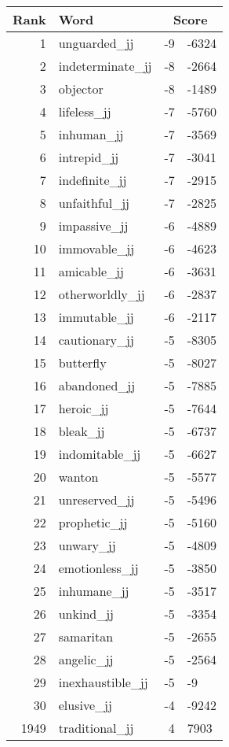 \begin{longtable}[!htbp]{| rlr@{.}l |}
    \hline
    \textbf{Rank} & \textbf{Word} & \multicolumn{2}{c|}{\textbf{Score}} \\
    \hline
    \endhead
    1 & unguarded\_jj & -9 & -6324 \\
    2 & indeterminate\_jj & -8 & -2664 \\
    3 & objector & -8 & -1489 \\
    4 & lifeless\_jj & -7 & -5760 \\
    5 & inhuman\_jj & -7 & -3569 \\
    6 & intrepid\_jj & -7 & -3041 \\
    7 & indefinite\_jj & -7 & -2915 \\
    8 & unfaithful\_jj & -7 & -2825 \\
    9 & impassive\_jj & -6 & -4889 \\
    10 & immovable\_jj & -6 & -4623 \\
    11 & amicable\_jj & -6 & -3631 \\
    12 & otherworldly\_jj & -6 & -2837 \\
    13 & immutable\_jj & -6 & -2117 \\
    14 & cautionary\_jj & -5 & -8305 \\
    15 & butterfly & -5 & -8027 \\
    16 & abandoned\_jj & -5 & -7885 \\
    17 & heroic\_jj & -5 & -7644 \\
    18 & bleak\_jj & -5 & -6737 \\
    19 & indomitable\_jj & -5 & -6627 \\
    20 & wanton & -5 & -5577 \\
    21 & unreserved\_jj & -5 & -5496 \\
    22 & prophetic\_jj & -5 & -5160 \\
    23 & unwary\_jj & -5 & -4809 \\
    24 & emotionless\_jj & -5 & -3850 \\
    25 & inhumane\_jj & -5 & -3517 \\
    26 & unkind\_jj & -5 & -3354 \\
    27 & samaritan & -5 & -2655 \\
    28 & angelic\_jj & -5 & -2564 \\
    29 & inexhaustible\_jj & -5 & -9 \\
    30 & elusive\_jj & -4 & -9242 \\
    1949 & traditional\_jj & 4 & 7903 \\

\end{longtable}
